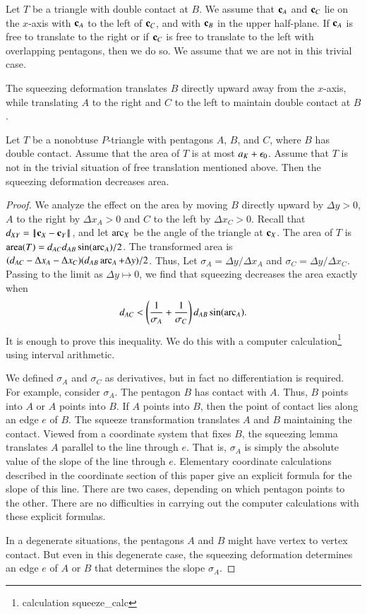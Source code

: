 Let $T$ be a triangle with double contact at $B$.  We assume that ${\mathbf c}_A$ and ${\mathbf c}_C$ lie on the $x$-axis with ${\mathbf c}_A$ to the left of ${\mathbf c}_C$, and
with ${\mathbf c}_B$ in the upper half-plane.
If ${\mathbf c}_A$ is free to translate to the right or if ${\mathbf c}_C$ is free to translate to the left with overlapping pentagons, then we do so.  We assume that
we are not in this trivial case.

The squeezing deformation translates $B$ directly upward away from the $x$-axis, while translating $A$ to the right and $C$ to the left to maintain
double contact at $B$.  

\begin{lemma}  Let $T$ be a nonobtuse $P$-triangle with pentagons $A$, $B$, and $C$, where $B$ has double contact.
Assume that the  area of $T$ is at most $a_K+\epsilon_0$.  Assume that $T$ is not in the trivial situation of free translation mentioned above.
Then the squeezing deformation decreases area.
\end{lemma}

\begin{proof}  We analyze the effect on the area by moving $B$ directly upward by $\Delta y >0$, $A$ to the right by $\Delta x_A >0$ and $C$ to the left by
$\Delta x_C >0$.  Recall that $\dx{XY} = \dd{X}{Y}$, and let $\operatorname{arc}_X$ be the angle of the triangle at ${\mathbf c}_X$.
The area of $T$ is ${\operatorname{area}}(T) = d_{AC} d_{AB} \sin(\operatorname{arc}_A)/2$.  The transformed area is $(d_{AC}-\Delta x_A - \Delta x_C)(d_{AB}\operatorname{arc}_A + \Delta y)/2$.  Thus,
Let $\sigma_A = \Delta y/\Delta x_A$ and $\sigma_C = \Delta y /\Delta x_C$.  Passing to the limit as $\Delta y \mapsto 0$, we find that squeezing
decreases the area exactly when
\[
d_{AC} < \left(\frac{1}{\sigma_A}+\frac{1}{\sigma_C}\right)d_{AB}\sin(\operatorname{arc}_A).
\]
It is enough to prove this inequality.  We do this with a computer calculation\footnote{calculation squeeze\_calc} using interval arithmetic.

We defined $\sigma_A$ and $\sigma_C$ as derivatives, but in fact no differentiation is required.  For example, consider $\sigma_A$.  The pentagon $B$
has contact with $A$.  Thus, $B$ points into $A$ or $A$ points into $B$.  If $A$ points into $B$, then the point of contact lies along an edge $e$ of $B$.
The squeeze transformation translates  $A$ and $B$ maintaining the contact.  
Viewed from a coordinate system that fixes $B$, the squeezing lemma translates $A$ parallel to the line through $e$.
That is, $\sigma_A$ is simply the absolute value of the slope of the line through $e$.
Elementary coordinate calculations described in the coordinate section of this paper give an explicit formula for the slope of this line.  There are two
cases, depending on which pentagon points to the other.  There are no difficulties in carrying out the computer calculations with these explicit formulas.

In a degenerate situations, the pentagons $A$ and $B$ might have vertex to vertex contact. But even in this degenerate case, the squeezing deformation
determines an edge $e$ of $A$ or $B$ that determines the slope $\sigma_A$.
\end{proof}

